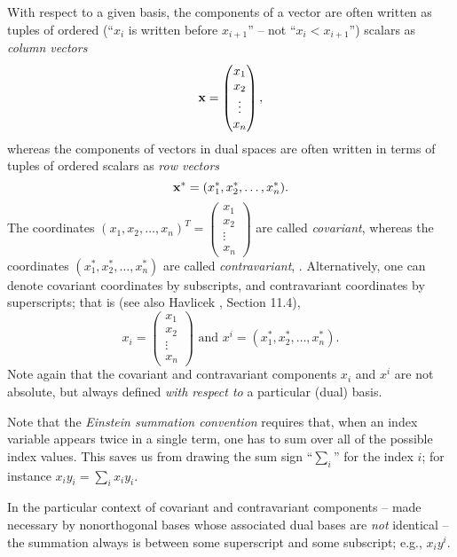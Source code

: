 With respect to a given basis,
the components of a vector are often written as tuples of ordered
(``$x_i$ is written before $x_{i+1}$'' -- not ``$x_i < x_{i+1}$'')
scalars  as {\em column vectors}
\begin{equation}
{\bf x}=
\begin{pmatrix}
x_1\\x_2\\
\vdots \\
x_n
\end{pmatrix}
,
\end{equation}
whereas the components of vectors in dual spaces are often written in terms of
 tuples of ordered
scalars  as {\em row vectors}
\begin{equation}
{\bf x}^*= (x_1^*,x_2^*,\ldots , x_n^*)
.
\end{equation}
The coordinates  $(x_1,x_2,\ldots , x_n)^T
=
\begin{pmatrix}
x_1\\
x_2\\
\vdots \\
x_n
\end{pmatrix}
$
are called
{\em covariant},
whereas the coordinates  $(x_1^*,x_2^*,\ldots , x_n^*)$
are called
{\em contravariant},
.
Alternatively, one can denote
covariant coordinates by subscripts,
and contravariant coordinates by superscripts; that is
(see also
Havlicek \cite{havlicek-laftm}, Section 11.4),
\begin{equation}
x_i =
\begin{pmatrix}
x_1\\
x_2\\
\vdots \\
x_n
\end{pmatrix}
\textrm{ and }
 x^i =
(x_1^*,x_2^*,\ldots , x_n^* ).
\end{equation}
Note again that the covariant and contravariant components
$x_i$ and $x^i$ are not absolute, but always defined {\em with respect to}
a particular (dual) basis.

Note that the {\em Einstein summation convention}
requires that, when an index variable appears twice in a single term, one has to
sum over all of the possible index values.
This saves us from drawing the sum sign ``$\sum_i$'' for the index $i$;
for instance $x_iy_i =\sum_{i}x_iy_i$.

In the particular context of covariant and contravariant components
--
made necessary by nonorthogonal bases whose associated dual bases are {\em not} identical
--
the summation always is between some superscript and some subscript;
e.g., $x_iy^i$.

